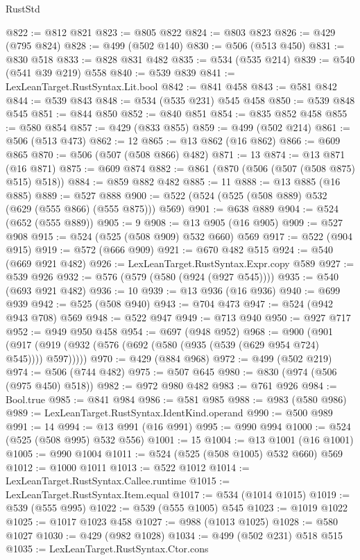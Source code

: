 \begin{lexlean}{RustStd}
\begin{coremodule}
{\begin{coremodule}
{{{{{{{{{{{{{@822 := @812 @821
@823 := @805 @822
@824 := @803 @823
@826 := @429 (@795 @824)
@828 := @499 (@502 @140)
@830 := @506 (@513 @450)
@831 := @830 @518
@833 := @828 @831 @482
@835 := @534 (@535 @214)
@839 := @540 (@541 @39 @219) @558
@840 := @539 @839
@841 := LexLeanTarget.RustSyntax.Lit.bool
@842 := @841 @458
@843 := @581 @842
@844 := @539 @843
@848 := @534 (@535 @231) @545 @458
@850 := @539 @848 @545
@851 := @844 @850
@852 := @840 @851
@854 := @835 @852 @458
@855 := @580 @854
@857 := @429 (@833 @855)
@859 := @499 (@502 @214)
@861 := @506 (@513 @473)
@862 := 12
@865 := @13 @862 (@16 @862)
@866 := @609 @865
@870 := @506 (@507 (@508 @866) @482)
@871 := 13
@874 := @13 @871 (@16 @871)
@875 := @609 @874
@882 := @861 (@870 (@506 (@507 (@508 @875) @515) @518))
@884 := @859 @882 @482
@885 := 11
@888 := @13 @885 (@16 @885)
@889 := @527 @888
@900 := @522 (@524 (@525 (@508 @889) @532 (@629 (@555 @866) (@555 @875))) @569)
@901 := @638 @889
@904 := @524 (@652 (@555 @889))
@905 := 9
@908 := @13 @905 (@16 @905)
@909 := @527 @908
@915 := @524 (@525 (@508 @909) @532 @660) @569
@917 := @522 (@904 @915)
@919 := @572 (@666 @909)
@921 := @670 @482 @515
@924 := @540 (@669 @921 @482)
@926 := LexLeanTarget.RustSyntax.Expr.copy @589
@927 := @539 @926
@932 := @576 (@579 (@580 (@924 (@927 @545))))
@935 := @540 (@693 @921 @482)
@936 := 10
@939 := @13 @936 (@16 @936)
@940 := @699 @939
@942 := @525 (@508 @940)
@943 := @704 @473
@947 := @524 (@942 @943 @708) @569
@948 := @522 @947
@949 := @713 @940
@950 := @927 @717
@952 := @949 @950 @458
@954 := @697 (@948 @952)
@968 := @900
    (@901 (@917 (@919 (@932 (@576 (@692 (@580 (@935 (@539 (@629 @954 @724) @545)))) @597)))))
@970 := @429 (@884 @968)
@972 := @499 (@502 @219)
@974 := @506 (@744 @482)
@975 := @507 @645
@980 := @830 (@974 (@506 (@975 @450) @518))
@982 := @972 @980 @482
@983 := @761 @926
@984 := Bool.true
@985 := @841 @984
@986 := @581 @985
@988 := @983 (@580 @986)
@989 := LexLeanTarget.RustSyntax.IdentKind.operand
@990 := @500 @989
@991 := 14
@994 := @13 @991 (@16 @991)
@995 := @990 @994
@1000 := @524 (@525 (@508 @995) @532 @556)
@1001 := 15
@1004 := @13 @1001 (@16 @1001)
@1005 := @990 @1004
@1011 := @524 (@525 (@508 @1005) @532 @660) @569
@1012 := @1000 @1011
@1013 := @522 @1012
@1014 := LexLeanTarget.RustSyntax.Callee.runtime
@1015 := LexLeanTarget.RustSyntax.Item.equal
@1017 := @534 (@1014 @1015)
@1019 := @539 (@555 @995)
@1022 := @539 (@555 @1005) @545
@1023 := @1019 @1022
@1025 := @1017 @1023 @458
@1027 := @988 (@1013 @1025)
@1028 := @580 @1027
@1030 := @429 (@982 @1028)
@1034 := @499 (@502 @231) @518 @515
@1035 := LexLeanTarget.RustSyntax.Ctor.cons
}}}}}}}}}}}}}
\end{coremodule}}
\end{coremodule}
\end{lexlean}
